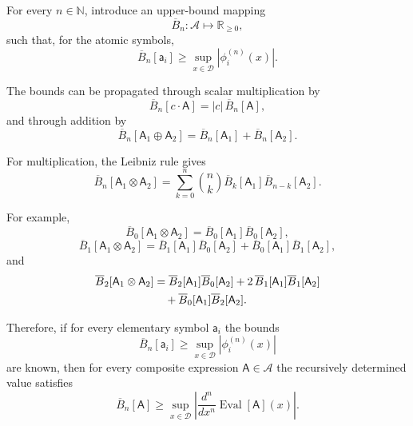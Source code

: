 \documentclass{article}
\theoremstyle{definition}
\begin{document}
For every $n\in\mathbb{N}$, introduce an upper-bound mapping
\begin{equation}
    \overline{B}_n:
    \mathcal{A}
    \mapsto
    \mathbb{R}_{\geq 0},
\end{equation}
such that, for the atomic symbols,
\begin{equation}
    \overline{B}_n[\mathsf{a}_i]
    \geq
    \sup_{x\in\mathcal{D}}
    \left|
        \phi_i^{(n)}(x)
    \right|.
\end{equation}

The bounds can be propagated through scalar multiplication by
\begin{equation}
    \overline{B}_n[c\cdot\mathsf{A}]
    =
    |c|\,
    \overline{B}_n[\mathsf{A}],
\end{equation}
and through addition by
\begin{equation}
    \overline{B}_n[
        \mathsf{A}_1\oplus\mathsf{A}_2
    ]
    =
    \overline{B}_n[\mathsf{A}_1]
    +
    \overline{B}_n[\mathsf{A}_2].
\end{equation}

For multiplication, the Leibniz rule gives
\begin{equation}
    \overline{B}_n[
        \mathsf{A}_1\otimes\mathsf{A}_2
    ]
    =
    \sum_{k=0}^{n}
    \binom{n}{k}
    \overline{B}_k[\mathsf{A}_1]
    \overline{B}_{n-k}[\mathsf{A}_2].
\end{equation}

For example,
\begin{equation}
    \overline{B}_0[
        \mathsf{A}_1\otimes\mathsf{A}_2
    ]
    =
    \overline{B}_0[\mathsf{A}_1]
    \overline{B}_0[\mathsf{A}_2],
\end{equation}
\begin{equation}
    \overline{B}_1[
        \mathsf{A}_1\otimes\mathsf{A}_2
    ]
    =
    \overline{B}_1[\mathsf{A}_1]
    \overline{B}_0[\mathsf{A}_2]
    +
    \overline{B}_0[\mathsf{A}_1]
    \overline{B}_1[\mathsf{A}_2],
\end{equation}
and
\begin{align}
    \overline{B}_2[
        \mathsf{A}_1\otimes\mathsf{A}_2
    ]
    &=
    \overline{B}_2[\mathsf{A}_1]
    \overline{B}_0[\mathsf{A}_2]
    +
    2\,
    \overline{B}_1[\mathsf{A}_1]
    \overline{B}_1[\mathsf{A}_2]
    \notag\\
    &\quad+
    \overline{B}_0[\mathsf{A}_1]
    \overline{B}_2[\mathsf{A}_2].
\end{align}

Therefore, if for every elementary symbol $\mathsf{a}_i$ the bounds
\begin{equation}
    \overline{B}_n[\mathsf{a}_i]
    \geq
    \sup_{x\in\mathcal{D}}
    \left|
        \phi_i^{(n)}(x)
    \right|
\end{equation}
are known, then for every composite expression
$\mathsf{A}\in\mathcal{A}$ the recursively determined value satisfies
\begin{equation}
    \overline{B}_n[\mathsf{A}]
    \geq
    \sup_{x\in\mathcal{D}}
    \left|
        \frac{d^n}{dx^n}
        \operatorname{Eval}[\mathsf{A}](x)
    \right|.
\end{equation}
\end{document}
